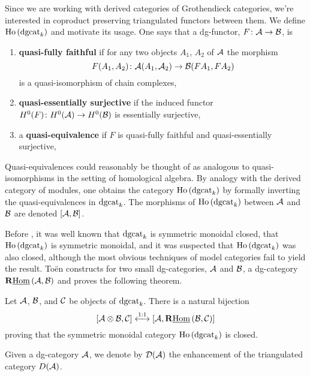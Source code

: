 \documentclass[reqno, 12pt]{amsart}
\begin{document}
Since we are working with derived categories of Grothendieck categories, we're interested in coproduct preserving triangulated functors between them.
We define $\operatorname{Ho}\left(\operatorname{dgcat}_k\right)$ and motivate its usage.
One says that a dg-functor, $F \colon \mathcal{A} \to \mathcal{B}$, is
\begin{enumerate}
\item
  \textbf{quasi-fully faithful} if for any two objects $A_1$, $A_2$ of $\mathcal{A}$ the morphism
  $$F(A_1, A_2) \colon \mathcal{A}(A_1, \mathcal{A}_2) \to \mathcal{B}(FA_1, FA_2)$$
  is a quasi-isomorphism of chain complexes,
\item
  \textbf{quasi-essentially surjective} if the induced functor $H^0(F) \colon H^0(\mathcal{A}) \to H^0(\mathcal{B})$ is essentially surjective,
\item
  a \textbf{quasi-equivalence} if $F$ is quasi-fully faithful and quasi-essentially surjective,
\end{enumerate}
Quasi-equivalences could reasonably be thought of as analogous to quasi-isomorphisms in the setting of homological algebra.
By analogy with the derived category of modules, one obtains the category $\operatorname{Ho}\left(\operatorname{dgcat}_k\right)$ by formally inverting the quasi-equivalences in $\operatorname{dgcat}_k$.
The morphisms of $\operatorname{Ho}\left(\operatorname{dgcat}_k\right)$ between $\mathcal{A}$ and $\mathcal{B}$ are denoted $[\mathcal{A},\mathcal{B}]$.

Before \cite{Toen}, it was well known that $\operatorname{dgcat}_k$ is symmetric monoidal closed, that $\operatorname{Ho}\left(\operatorname{dgcat}_k\right)$ is symmetric monoidal, and it was suspected that $\operatorname{Ho}\left(\operatorname{dgcat}_k\right)$ was also closed, although the most obvious techniques of model categories fail to yield the result.
To\"en constructs for two small dg-categories, $\mathcal{A}$ and $\mathcal{B}$, a dg-category $\mathbf{R}\underline{\operatorname{Hom}}\left(\mathcal{A},\mathcal{B}\right)$ and proves the following theorem.
\begin{theorem} \label{theorem: Toen}
  Let $\mathcal{A}$, $\mathcal{B}$, and $\mathcal{C}$ be objects of $\operatorname{dgcat}_k$.
  There is a natural bijection
  $$[\mathcal{A} \otimes \mathcal{B}, \mathcal{C}] \overset{1:1}\longleftrightarrow [\mathcal{A}, \mathbf{R}\underline{\operatorname{Hom}}\left(\mathcal{B},\mathcal{C}\right)]$$
  proving that the symmetric monoidal category $\operatorname{Ho}\left(\operatorname{dgcat}_k\right)$ is closed.
\end{theorem}

Given a dg-category $\mathcal{A}$, we denote by $\mathcal{D}(\mathcal{A})$ the enhancement of the triangulated category $D(\mathcal{A})$.
\end{document}
